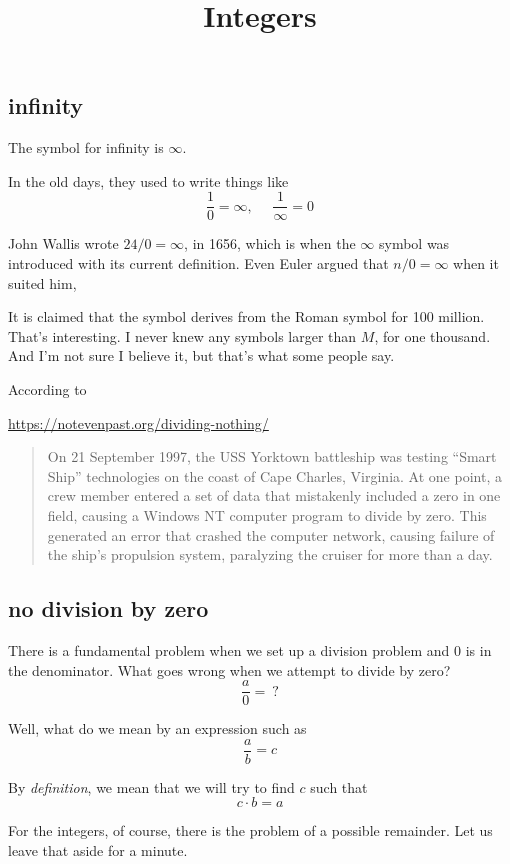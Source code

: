 \documentclass[11pt, oneside]{article}
\title{Integers}
\date{}
\begin{document}
\maketitle
\Large


\subsection*{infinity}
The symbol for infinity is $\infty$.

In the old days, they used to write things like
\[ \frac{1}{0} = \infty,  \ \ \ \ \ \ \frac{1}{\infty} = 0 \]

John Wallis wrote $24/0 = \infty$, in 1656, which is when the $\infty$ symbol was introduced with its current definition.  Even Euler argued that $n/0 = \infty$ when it suited him,

It is claimed that the symbol derives from the Roman symbol for 100 million.  That's interesting.  I never knew any symbols larger than $M$, for one thousand.  And I'm not sure I believe it, but that's what some people say.

According to

\url{https://notevenpast.org/dividing-nothing/}

\begin{quote}
On 21 September 1997, the USS Yorktown battleship was testing “Smart Ship” technologies on the coast of Cape Charles, Virginia. At one point, a crew member entered a set of data that mistakenly included a zero in one field, causing a Windows NT computer program to divide by zero. This generated an error that crashed the computer network, causing failure of the ship’s propulsion system, paralyzing the cruiser for more than a day.
\end{quote}

\subsection*{no division by zero}
There is a fundamental problem when we set up a division problem and $0$ is in the denominator.  What goes wrong when we attempt to divide by zero?
\[ \frac{a}{0} = \ ? \]

Well, what do we mean by an expression such as 
\[ \frac{a}{b} = c \]

By \emph{definition}, we mean that we will try to find $c$ such that
\[ c \cdot b = a \]

For the integers, of course, there is the problem of a possible remainder.  Let us leave that aside for a minute.
\end{document}
